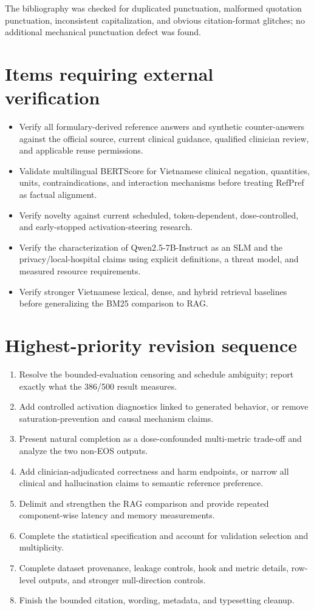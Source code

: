 \documentclass[11pt]{article}
\begin{document}
The bibliography was checked for duplicated punctuation, malformed quotation punctuation, inconsistent capitalization, and obvious citation-format glitches; no additional mechanical punctuation defect was found.

\section*{Items requiring external verification}

\begin{itemize}
    \item Verify all formulary-derived reference answers and synthetic counter-answers against the official source, current clinical guidance, qualified clinician review, and applicable reuse permissions.
    \item Validate multilingual BERTScore for Vietnamese clinical negation, quantities, units, contraindications, and interaction mechanisms before treating RefPref as factual alignment.
    \item Verify novelty against current scheduled, token-dependent, dose-controlled, and early-stopped activation-steering research.
    \item Verify the characterization of Qwen2.5-7B-Instruct as an SLM and the privacy/local-hospital claims using explicit definitions, a threat model, and measured resource requirements.
    \item Verify stronger Vietnamese lexical, dense, and hybrid retrieval baselines before generalizing the BM25 comparison to RAG.
\end{itemize}

\section*{Highest-priority revision sequence}

\begin{enumerate}
    \item Resolve the bounded-evaluation censoring and schedule ambiguity; report exactly what the 386/500 result measures.
    \item Add controlled activation diagnostics linked to generated behavior, or remove saturation-prevention and causal mechanism claims.
    \item Present natural completion as a dose-confounded multi-metric trade-off and analyze the two non-EOS outputs.
    \item Add clinician-adjudicated correctness and harm endpoints, or narrow all clinical and hallucination claims to semantic reference preference.
    \item Delimit and strengthen the RAG comparison and provide repeated component-wise latency and memory measurements.
    \item Complete the statistical specification and account for validation selection and multiplicity.
    \item Complete dataset provenance, leakage controls, hook and metric details, row-level outputs, and stronger null-direction controls.
    \item Finish the bounded citation, wording, metadata, and typesetting cleanup.
\end{enumerate}
\end{document}
